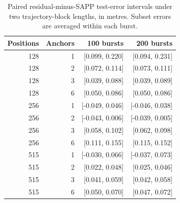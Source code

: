 \begin{table}[ht]
\centering
\caption{Paired residual-minus-SAPP test-error intervals under two trajectory-block lengths, in metres. Subset errors are averaged within each burst.}
\label{tab:uwbblocks}
\begin{tabular}{rrrr}
\toprule
Positions & Anchors & 100 bursts & 200 bursts\\
\midrule
128 & 1 & [0.099, 0.220] & [0.094, 0.231]\\
128 & 2 & [0.072, 0.114] & [0.073, 0.111]\\
128 & 3 & [0.039, 0.088] & [0.039, 0.089]\\
128 & 6 & [0.050, 0.086] & [0.050, 0.086]\\
256 & 1 & [-0.049, 0.046] & [-0.046, 0.038]\\
256 & 2 & [-0.043, 0.006] & [-0.039, 0.005]\\
256 & 3 & [0.058, 0.102] & [0.062, 0.098]\\
256 & 6 & [0.111, 0.155] & [0.115, 0.152]\\
515 & 1 & [-0.030, 0.066] & [-0.037, 0.073]\\
515 & 2 & [0.022, 0.048] & [0.025, 0.046]\\
515 & 3 & [0.041, 0.059] & [0.042, 0.058]\\
515 & 6 & [0.050, 0.070] & [0.047, 0.072]\\
\bottomrule
\end{tabular}
\end{table}

